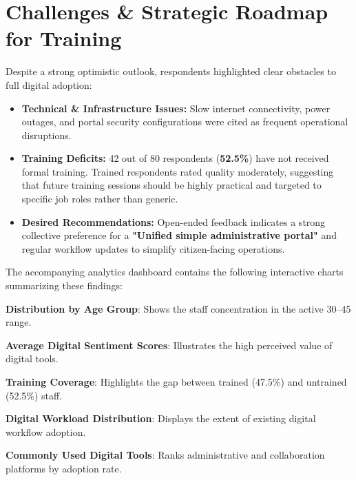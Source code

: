 \documentclass[10pt,a4paper]{article}
\begin{document}
\section{Challenges \& Strategic Roadmap for Training}
Despite a strong optimistic outlook, respondents highlighted clear obstacles to full digital adoption:
\begin{itemize}
  \item \textbf{Technical \& Infrastructure Issues:} Slow internet connectivity, power outages, and portal security configurations were cited as frequent operational disruptions.
  \item \textbf{Training Deficits:} 42 out of 80 respondents (\textbf{52.5\%}) have not received formal training. Trained respondents rated quality moderately, suggesting that future training sessions should be highly practical and targeted to specific job roles rather than generic.
  \item \textbf{Desired Recommendations:} Open-ended feedback indicates a strong collective preference for a \textbf{"Unified simple administrative portal"} and regular workflow updates to simplify citizen-facing operations.
\end{itemize}

\vspace{0.1cm}

\begin{tcolorbox}[colback=lightgray!80,colframe=gold,arc=2pt,title=\textbf{Visualizations Roadmap \& Charts Appendix},coltitle=navyblue,fonttitle=\bfseries\footnotesize,top=3pt,bottom=3pt,left=6pt,right=6pt]
\fontsize{8.5}{11}\selectfont
The accompanying analytics dashboard contains the following interactive charts summarizing these findings:
\begin{enumerate*}[label=\textbf{\arabic*.}]
  \item \textbf{Distribution by Age Group}: Shows the staff concentration in the active 30--45 range. \quad
  \item \textbf{Average Digital Sentiment Scores}: Illustrates the high perceived value of digital tools. \quad
  \item \textbf{Training Coverage}: Highlights the gap between trained (47.5\%) and untrained (52.5\%) staff. \quad
  \item \textbf{Digital Workload Distribution}: Displays the extent of existing digital workflow adoption. \quad
  \item \textbf{Commonly Used Digital Tools}: Ranks administrative and collaboration platforms by adoption rate.
\end{enumerate*}
\end{tcolorbox}
\end{document}
